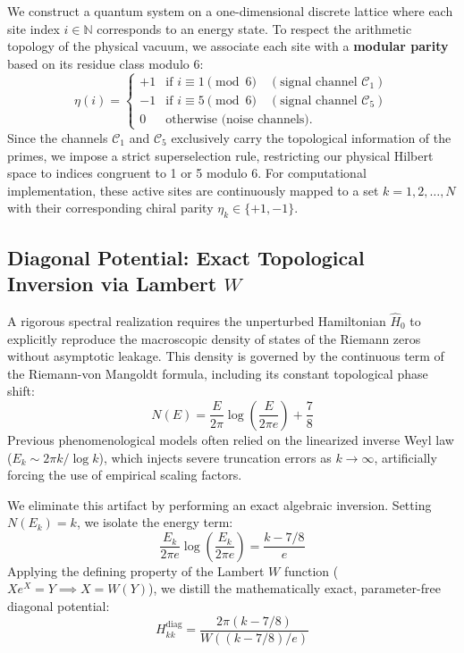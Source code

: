 \documentclass[aps,prl,preprint,superscriptaddress,floatfix]{revtex4-2}
\begin{document}
We construct a quantum system on a one-dimensional discrete lattice where each site index $i \in \mathbb{N}$ corresponds to an energy state. To respect the arithmetic topology of the physical vacuum, we associate each site with a \textbf{modular parity} based on its residue class modulo 6:
\begin{equation}
\eta(i) = \begin{cases}
+1 & \text{if } i \equiv 1 \pmod 6 \quad (\text{signal channel } \mathcal{C}_1)\\
-1 & \text{if } i \equiv 5 \pmod 6 \quad (\text{signal channel } \mathcal{C}_5)\\
0 & \text{otherwise (noise channels)}.
\end{cases}
\end{equation}
Since the channels $\mathcal{C}_1$ and $\mathcal{C}_5$ exclusively carry the topological information of the primes, we impose a strict superselection rule, restricting our physical Hilbert space to indices congruent to 1 or 5 modulo 6. For computational implementation, these active sites are continuously mapped to a set $k = 1,2,\dots,N$ with their corresponding chiral parity $\eta_k \in \{+1,-1\}$.

\subsection{Diagonal Potential: Exact Topological Inversion via Lambert \texorpdfstring{$W$}{W}}

A rigorous spectral realization requires the unperturbed Hamiltonian $\hat{H}_0$ to explicitly reproduce the macroscopic density of states of the Riemann zeros without asymptotic leakage. This density is governed by the continuous term of the Riemann-von Mangoldt formula, including its constant topological phase shift:
\begin{equation}
N(E) = \frac{E}{2\pi} \log\left(\frac{E}{2\pi e}\right) + \frac{7}{8}
\end{equation}
Previous phenomenological models often relied on the linearized inverse Weyl law ($E_k \sim 2\pi k / \log k$), which injects severe truncation errors as $k \to \infty$, artificially forcing the use of empirical scaling factors. 

We eliminate this artifact by performing an exact algebraic inversion. Setting $N(E_k) = k$, we isolate the energy term:
\begin{equation}
\frac{E_k}{2\pi e} \log\left(\frac{E_k}{2\pi e}\right) = \frac{k - 7/8}{e}
\end{equation}
Applying the defining property of the Lambert $W$ function ($X e^X = Y \implies X = W(Y)$), we distill the mathematically exact, parameter-free diagonal potential:
\begin{equation}
\boxed{ H_{kk}^{\text{diag}} = \frac{2\pi (k - 7/8)}{W((k - 7/8)/e)} }
\end{equation}
\end{document}
